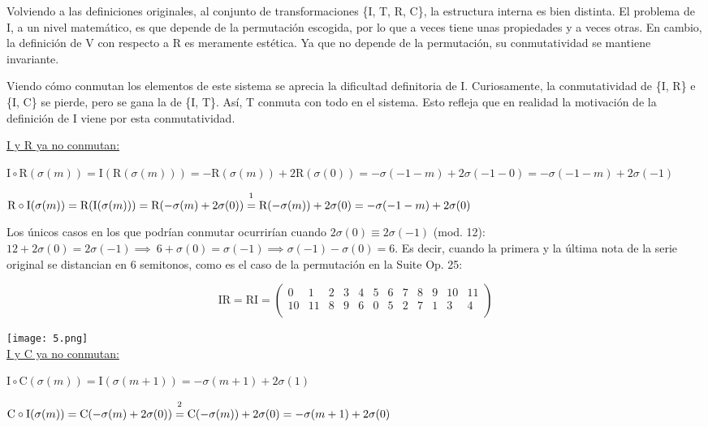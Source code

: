 		Volviendo a las definiciones originales, al conjunto de transformaciones \{I, T, R, C\}, la estructura interna es bien distinta. El problema de I, a un nivel matemático, es que depende de la permutación escogida, por lo que a veces tiene unas propiedades y a veces otras. En cambio, la definición de V con respecto a R es meramente estética. Ya que no depende de la permutación, su conmutatividad se mantiene invariante. 
		
		Viendo cómo conmutan los elementos de este sistema se aprecia la dificultad definitoria de I. Curiosamente, la conmutatividad de \{I, R\} e \{I, C\} se pierde, pero se gana la de \{I, T\}. Así, T conmuta con todo en el sistema. Esto refleja que en realidad la motivación de la definición de I viene por esta conmutatividad.
		
		\underline{I y R ya no conmutan:}
		
		$\text{I}\circ\text{R}(\sigma(m))=\text{I}(\text{R}(\sigma(m)))=-\text{R}(\sigma(m))+2\text{R}(\sigma(0))=-\sigma(-1-m)+2\sigma(-1-0)=-\sigma(-1-m)+2\sigma(-1)$
		
		$\text{R}\circ\text{I}(\sigma(m))=\text{R}(\text{I}(\sigma(m)))=\text{R}(-\sigma(m)+2\sigma(0))\overset{\footnote{R y T conmutan}}{=}\text{R}(-\sigma(m))+2\sigma(0)=-\sigma(-1-m)+2\sigma(0)$
		
		Los únicos casos en los que podrían conmutar ocurrirían cuando $2\sigma\left(0\right)\equiv2\sigma(-1)$ (mod. 12): $12+2\sigma\left(0\right)=2\sigma\left(-1\right)\implies\ 6+\sigma\left(0\right)=\sigma\left(-1\right)\implies \sigma\left(-1\right)-\sigma\left(0\right)=6$. Es decir, cuando la primera y la última nota de la serie original se distancian en 6 semitonos, como es el caso de la permutación en la Suite Op. 25:
		
		$$
		\text{IR}=\text{RI}=\left(\begin{matrix}0&1&2&3&4&5&6&7&8&9&10&11\\10&11&8&9&6&0&5&2&7&1&3&4\\\end{matrix}\right)
		$$	
		
		\texttt{[image: 5.png]}\\
		
		\underline{I y C ya no conmutan:}
		
		$\text{I}\circ\text{C}(\sigma(m))=\text{I}(\sigma(m+1))=-\sigma(m+1)+2\sigma(1)$
		
		$\text{C}\circ\text{I}(\sigma(m))=\text{C}(-\sigma(m)+2\sigma(0))\overset{\footnote{C y T conmutan}}{=}\text{C}(-\sigma(m))+2\sigma(0)=-\sigma(m+1)+2\sigma(0)$
		
